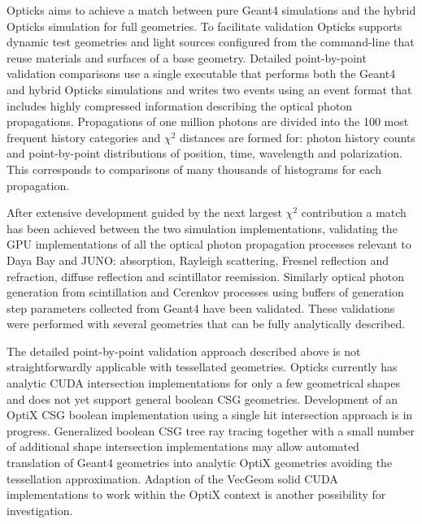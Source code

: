 \documentclass[a4paper]{jpconf}
\begin{document}
Opticks aims to achieve a match between pure Geant4 simulations and the 
hybrid Opticks simulation for full geometries. 
To facilitate validation Opticks supports dynamic test geometries and light sources
configured from the command-line that reuse materials and surfaces of a base geometry.
Detailed point-by-point validation comparisons use a single executable that performs both
the Geant4 and hybrid Opticks simulations and writes two events using
an event format that includes highly compressed information
describing the optical photon propagations. Propagations of one million photons are 
divided into the 100 most frequent history categories and $\chi^{2}$ distances 
are formed for: photon history counts and point-by-point distributions of position, time, wavelength and polarization.
This corresponds to comparisons of many thousands of histograms for each propagation.


After extensive development guided by the next largest $\chi^{2}$ contribution 
a match has been achieved between the two simulation implementations, validating 
the GPU implementations of all the optical photon propagation processes relevant to Daya Bay and JUNO:
absorption, Rayleigh scattering, Fresnel reflection and refraction, diffuse reflection
and scintillator reemission. Similarly optical photon generation from scintillation and Cerenkov processes
using buffers of generation step parameters collected from Geant4 have been validated.
These validations were performed with several geometries that can be fully analytically described.

The detailed point-by-point validation approach described above is not straightforwardly 
applicable with tessellated geometries. Opticks currently has analytic CUDA intersection implementations 
for only a few geometrical shapes and does not yet support general boolean CSG geometries.
Development of an OptiX CSG boolean implementation using a single hit intersection
approach is in progress.
Generalized boolean CSG tree ray tracing together with a small number of additional shape intersection
implementations may allow automated translation of Geant4 geometries into analytic OptiX geometries
avoiding the tessellation approximation. Adaption of the VecGeom\cite{VecGeom} solid CUDA implementations 
to work within the OptiX context is another possibility for investigation.
\end{document}

